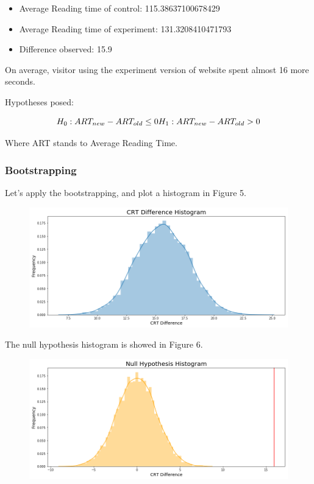 \documentclass[]{book}
\providecommand{\tightlist}{%
  \setlength{\itemsep}{0pt}\setlength{\parskip}{0pt}}
\begin{document}
\begin{itemize}
\tightlist
\item
  Average Reading time of control: 115.38637100678429
\item
  Average Reading time of experiment: 131.3208410471793
\item
  Difference observed: 15.9
\end{itemize}

On average, visitor using the experiment version of website spent almost
16 more seconds.

Hypotheses posed:

\[H_0 : ART_{new} - ART_{old} \leq 0 \\
  H_1 : ART_{new} - ART_{old} > 0\]

Where ART stands to Average Reading Time.

\subsubsection*{Bootstrapping}\label{bootstrapping-2}

Let's apply the bootstrapping, and plot a histogram in Figure 5.

\begin{figure}
\centering
\includegraphics{01-img/c4_l13_05.png}
\caption{}
\end{figure}

The null hypothesis histogram is showed in Figure 6.

\begin{figure}
\centering
\includegraphics{01-img/c4_l13_06.png}
\caption{}
\end{figure}
\end{document}
